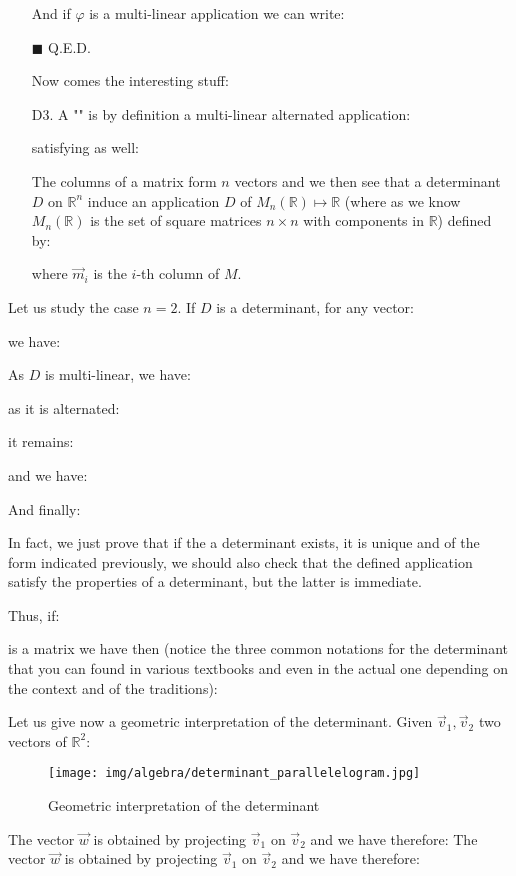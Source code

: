 \begin{enumerate}
\begin{dem}
		And if $\varphi$ is a multi-linear application we can write:
		
		\begin{flushright}
			$\blacksquare$  Q.E.D.
		\end{flushright}
		\end{dem}
		Now comes the interesting stuff:
		
		\item[D3.]  A "" is by definition a multi-linear alternated application:
		
		satisfying as well:
		
		\begin{tcolorbox}[title=Remark,colframe=black,arc=10pt]
		The columns of a matrix form $n$ vectors and we then see that a determinant $D$ on $\mathbb{R}^n$ induce an application $D$ of $M_n(\mathbb{R})\mapsto \mathbb{R}$ (where as we know $M_n(\mathbb{R})$ is the set of square matrices $n\times n$ with components in $\mathbb{R}$) defined by:
		
		where $\vec{m}_i$ is the $i$-th column of $M$. 
		\end{tcolorbox}	
	\end{enumerate}
	Let us study the case $n=2$. If $D$ is a determinant, for any vector:
	
	we have:
	
	As $D$ is multi-linear, we have:
	
	as it is alternated:
	
	it remains:
	
	and we have:
	
	And finally:
	
	In fact, we just prove that if the a determinant exists, it is unique and of the form indicated previously, we should also check that the defined application satisfy the properties of a determinant, but the latter is immediate.
	
	Thus, if:
	
	is a matrix we have then (notice the three common notations for the determinant that you can found in various textbooks and even in the actual one depending on the context and of the traditions):
	
	Let us give now a geometric interpretation of the determinant. Given $\vec{v}_1,\vec{v}_2$ two vectors of $\mathbb{R}^2$:
	\begin{figure}[H]
		\centering
		\texttt{[image: img/algebra/determinant\_parallelelogram.jpg]}
		\caption{Geometric interpretation of the determinant}
	\end{figure}
	The vector $\vec{w}$ is obtained by projecting $\vec{v}_1$ on $\vec{v}_2$ and we have therefore:
	The vector $\vec{w}$ is obtained by projecting $\vec{v}_1$ on $\vec{v}_2$ and we have therefore:
	
